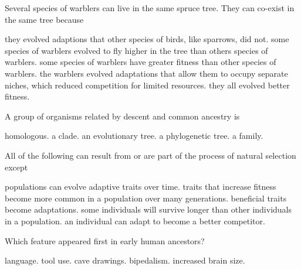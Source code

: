 \question
Several species of warblers can live in the same spruce tree. They can co-exist in the same tree because

\begin{choices}
\choice they evolved adaptions that other species of birds, like sparrows, did not.
\choice some species of warblers evolved to fly higher in the tree than others species of warblers.
\choice some species of warblers have greater fitness than other species of warblers.
\correctchoice the warblers evolved adaptations that allow them to occupy separate niches, which reduced competition for limited resources.
\choice they all evolved better fitness.
\end{choices}

\newpage

\question
A group of organisms related by descent and common ancestry is

\begin{choices}
\choice homologous.
\correctchoice a clade.
\choice an evolutionary tree.
\choice a phylogenetic tree.
\choice a family.
\end{choices}

\question
All of the following can result from or are part of the process of natural selection except

\begin{choices}
\choice populations can evolve adaptive traits over time.
\choice traits that increase fitness become more common in a population over many generations.
\choice beneficial traits become adaptations.
\choice some individuals will survive longer than other individuals in a population.
\correctchoice an individual can adapt to become a better competitor.
\end{choices}

\question
Which feature appeared first in early human ancestors?

\begin{choices}
\choice language.
\choice tool use.
\choice cave drawings.
\correctchoice bipedalism.
\choice increased brain size.
\end{choices}
